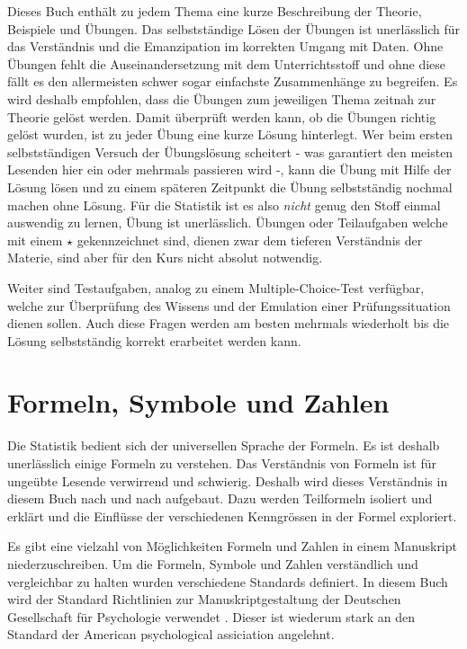 \documentclass[
]{book}
\theoremstyle{definition}
\theoremstyle{definition}
\theoremstyle{definition}
\theoremstyle{definition}
\theoremstyle{remark}
\begin{document}
Dieses Buch enthält zu jedem Thema eine kurze Beschreibung der Theorie, Beispiele und Übungen. Das selbstständige Lösen der Übungen ist unerlässlich für das Verständnis und die Emanzipation im korrekten Umgang mit Daten. Ohne Übungen fehlt die Auseinandersetzung mit dem Unterrichtsstoff und ohne diese fällt es den allermeisten schwer sogar einfachste Zusammenhänge zu begreifen. Es wird deshalb empfohlen, dass die Übungen zum jeweiligen Thema zeitnah zur Theorie gelöst werden. Damit überprüft werden kann, ob die Übungen richtig gelöst wurden, ist zu jeder Übung eine kurze Lösung hinterlegt. Wer beim ersten selbstständigen Versuch der Übungslösung scheitert - was garantiert den meisten Lesenden hier ein oder mehrmals passieren wird -, kann die Übung mit Hilfe der Lösung lösen und zu einem späteren Zeitpunkt die Übung selbstständig nochmal machen ohne Lösung. Für die Statistik ist es also \emph{nicht} genug den Stoff einmal auswendig zu lernen, Übung ist unerlässlich. Übungen oder Teilaufgaben welche mit einem \(\star\) gekennzeichnet sind, dienen zwar dem tieferen Verständnis der Materie, sind aber für den Kurs nicht absolut notwendig.

Weiter sind Testaufgaben, analog zu einem Multiple-Choice-Test verfügbar, welche zur Überprüfung des Wissens und der Emulation einer Prüfungssituation dienen sollen. Auch diese Fragen werden am besten mehrmals wiederholt bis die Lösung selbstständig korrekt erarbeitet werden kann.

\section{Formeln, Symbole und Zahlen}\label{formeln}

Die Statistik bedient sich der universellen Sprache der Formeln. Es ist deshalb unerlässlich einige Formeln zu verstehen. Das Verständnis von Formeln ist für ungeübte Lesende verwirrend und schwierig. Deshalb wird dieses Verständnis in diesem Buch nach und nach aufgebaut. Dazu werden Teilformeln isoliert und erklärt und die Einflüsse der verschiedenen Kenngrössen in der Formel exploriert.

Es gibt eine vielzahl von Möglichkeiten Formeln und Zahlen in einem Manuskript niederzuschreiben. Um die Formeln, Symbole und Zahlen verständlich und vergleichbar zu halten wurden verschiedene Standards definiert. In diesem Buch wird der Standard Richtlinien zur Manuskriptgestaltung der Deutschen Gesellschaft für Psychologie verwendet \citep{dgp2019}. Dieser ist wiederum stark an den Standard der American psychological assiciation angelehnt.
\end{document}
